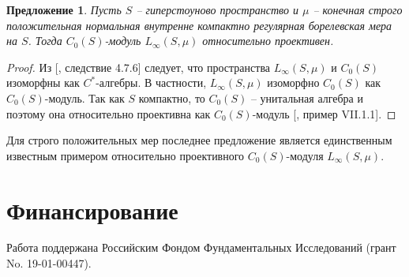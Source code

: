 \documentclass[12pt]{article}
\newtheorem{proposition}[theorem]{Предложение}
\begin{document}
\begin{proposition}\label{LInfReProjSuffCond} Пусть $S$ -- гиперстоуново пространство и $\mu$ -- конечная строго положительная нормальная внутренне компактно регулярная борелевская мера на $S$. Тогда $C_0(S)$-модуль $L_\infty(S,\mu)$ относительно проективен.
\end{proposition}
\begin{proof} Из [\cite{DalesBanSpContFunDualSp}, следствие 4.7.6] следует, что пространства $L_\infty(S,\mu)$ и $C_0(S)$ изоморфны как $C^*$-алгебры. В частности, $L_\infty(S,\mu)$ изоморфно $C_0(S)$ как $C_0(S)$-модуль. Так как $S$ компактно, то $C_0(S)$ -- унитальная алгебра и поэтому она относительно проективна как $C_0(S)$-модуль [\cite{HelBanLocConvAlg}, пример VII.1.1].
\end{proof}

Для строго положительных мер последнее предложение является единственным известным примером относительно проективного $C_0(S)$-модуля $L_\infty(S,\mu)$.

\section{Финансирование}
\label{SectionFunding}
Работа поддержана Российским Фондом Фундаментальных Исследований (грант No. 19-01-00447).
\end{document}
